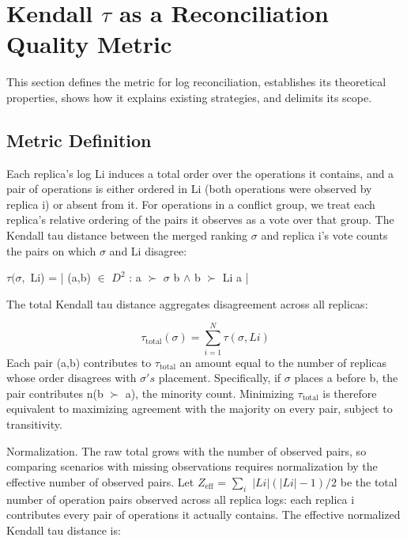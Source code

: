 \documentclass[journal]{IEEEtran}
\begin{document}
\section{Kendall $\tau$ as a Reconciliation Quality Metric}
This section defines the metric for log reconciliation, establishes its theoretical properties, shows how it explains existing strategies, and delimits its scope.

\subsection{Metric Definition}
Each replica's log Li induces a total order over the operations it contains, and a pair of operations is either ordered in Li (both operations were observed by replica i) or absent from it. For operations in a conflict group, we treat each replica's relative ordering of the pairs it observes as a vote over that group. The Kendall tau distance between the merged ranking $\sigma$ and replica i's vote counts the pairs on which $\sigma$ and Li disagree:

$\tau(\sigma,$ Li) = |{ (a,b) $\in$ $D^{2}$ : a $\succ$ $\sigma$ b $\wedge$ b $\succ$ Li a }|

The total Kendall tau distance aggregates disagreement across all replicas:

\[ \tau_{\mathrm{total}}(\sigma) = \sum_{i=1}^{N} \tau(\sigma, Li) \]
Each pair (a,b) contributes to $\tau_{\mathrm{total}}$ an amount equal to the number of replicas whose order disagrees with $\sigma's$ placement. Specifically, if $\sigma$ places a before b, the pair contributes n(b $\succ$ a), the minority count. Minimizing $\tau_{\mathrm{total}}$ is therefore equivalent to maximizing agreement with the majority on every pair, subject to transitivity.

Normalization. The raw total grows with the number of observed pairs, so comparing scenarios with missing observations requires normalization by the effective number of observed pairs. Let $Z_{\mathrm{eff}}$ = $\sum_{i}$ $|Li|(|Li|-1)/2$ be the total number of operation pairs observed across all replica logs: each replica i contributes every pair of operations it actually contains. The effective normalized Kendall tau distance is:
\end{document}
